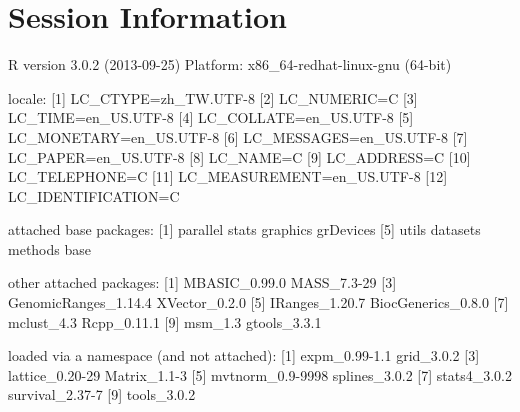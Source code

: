 \documentclass[a4paper,10pt]{article}
\begin{document}
\section{Session Information}

\begin{Schunk}
\begin{Soutput}
R version 3.0.2 (2013-09-25)
Platform: x86_64-redhat-linux-gnu (64-bit)

locale:
 [1] LC_CTYPE=zh_TW.UTF-8      
 [2] LC_NUMERIC=C              
 [3] LC_TIME=en_US.UTF-8       
 [4] LC_COLLATE=en_US.UTF-8    
 [5] LC_MONETARY=en_US.UTF-8   
 [6] LC_MESSAGES=en_US.UTF-8   
 [7] LC_PAPER=en_US.UTF-8      
 [8] LC_NAME=C                 
 [9] LC_ADDRESS=C              
[10] LC_TELEPHONE=C            
[11] LC_MEASUREMENT=en_US.UTF-8
[12] LC_IDENTIFICATION=C       

attached base packages:
[1] parallel  stats     graphics  grDevices
[5] utils     datasets  methods   base     

other attached packages:
 [1] MBASIC_0.99.0        MASS_7.3-29         
 [3] GenomicRanges_1.14.4 XVector_0.2.0       
 [5] IRanges_1.20.7       BiocGenerics_0.8.0  
 [7] mclust_4.3           Rcpp_0.11.1         
 [9] msm_1.3              gtools_3.3.1        

loaded via a namespace (and not attached):
[1] expm_0.99-1.1    grid_3.0.2      
[3] lattice_0.20-29  Matrix_1.1-3    
[5] mvtnorm_0.9-9998 splines_3.0.2   
[7] stats4_3.0.2     survival_2.37-7 
[9] tools_3.0.2     
\end{Soutput}
\end{Schunk}



%


\end{document}

